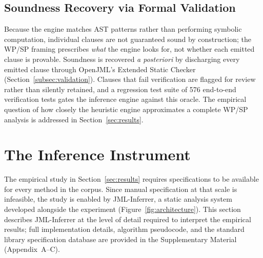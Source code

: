 \documentclass[11pt]{article}
\begin{document}
\subsection{Soundness Recovery via Formal Validation}
\label{subsec:soundness-recovery}

Because the engine matches AST patterns rather than performing symbolic computation, individual clauses are not guaranteed sound by construction; the WP/SP framing prescribes \emph{what} the engine looks for, not whether each emitted clause is provable. Soundness is recovered \emph{a posteriori} by discharging every emitted clause through OpenJML's Extended Static Checker~\cite{openjml} (Section~\ref{subsec:validation}). Clauses that fail verification are flagged for review rather than silently retained, and a regression test suite of 576 end-to-end verification tests gates the inference engine against this oracle. The empirical question of how closely the heuristic engine approximates a complete WP/SP analysis is addressed in Section~\ref{sec:results}.

\section{The Inference Instrument}
\label{sec:approach}

The empirical study in Section~\ref{sec:results} requires specifications to be available for every method in the corpus. Since manual specification at that scale is infeasible, the study is enabled by JML-Inferrer, a static analysis system developed alongside the experiment (Figure~\ref{fig:architecture}). This section describes JML-Inferrer at the level of detail required to interpret the empirical results; full implementation details, algorithm pseudocode, and the standard library specification database are provided in the Supplementary Material (Appendix~A--C).
\end{document}
